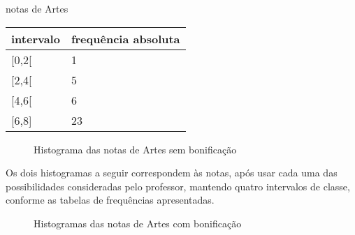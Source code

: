 \begin{task}{ notas de Artes}
\begin{enumerate}
\begin{savenotes}\sphinxattablestart
\centering
{}
\label{\detokenize{PE104-0:id6}}
\sphinxaftercaption
\begin{tabulary}{\linewidth}[t]{|T|T|}
\hline

intervalo
&
frequência absoluta
\\
\hline
{[}0,2{[}
&
1
\\
\hline
{[}2,4{[}
&
5
\\
\hline
{[}4,6{[}
&
6
\\
\hline
{[}6,8{]}
&
23
\\
\hline
\end{tabulary}
\par
\sphinxattableend\end{savenotes}

\begin{figure}[H]
\centering
\capstart

\noindent{}
\caption{Histograma das notas de Artes sem bonificação}\label{\detokenize{PE104-0:fig-histograma-notas-sem-bonificacao}}\label{\detokenize{PE104-0:id7}}\end{figure}

Os dois histogramas a seguir correspondem às notas, após usar cada uma das possibilidades consideradas pelo professor, mantendo quatro intervalos de classe, conforme as tabelas de frequências apresentadas.

\begin{figure}[H]
\centering
\capstart

\noindent{}
\caption{Histogramas das notas de Artes com bonificação}\label{\detokenize{PE104-0:fig-histogramas-notas-aleteradas}}\label{\detokenize{PE104-0:id8}}\end{figure}

\begin{minipage}[h]{.45\textwidth}
\begin{savenotes}\sphinxattablestart
\centering
{}
\label{\detokenize{PE104-0:id9}}
\sphinxaftercaption
\begin{tabulary}{\linewidth}[t]{|c|c|}
\hline


\end{tabulary}
\end{savenotes}
\end{minipage}
\end{enumerate}
\end{task}
